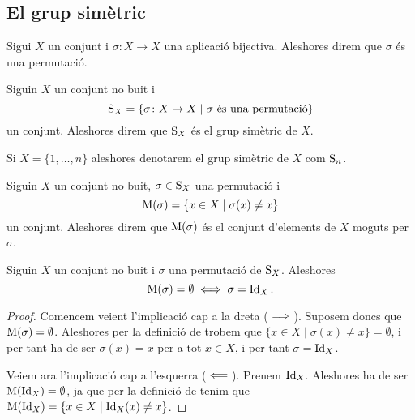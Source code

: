 \documentclass[../Apunts.tex]{subfiles}
\begin{document}
	\subsection{El grup simètric}
	\begin{definition}[Permutació]
		\label{def:permutació}
		Sigui \(X\) un conjunt i \(\sigma\colon X\rightarrow X\) una aplicació bijectiva. Aleshores direm que \(\sigma\) és una permutació.
	\end{definition}
	\begin{definition}
		\label{def:grup simètric}
		Siguin \(X\) un conjunt no buit i
		\[\operatorname{S}_{X}=\{\sigma\colon X\rightarrow X\mid\sigma\text{ és una permutació}\}\]
		un conjunt. Aleshores direm que \(\operatorname{S}_{X}\) és el grup simètric de \(X\).
		
		Si \(X=\{1,\dots,n\}\) aleshores denotarem el grup simètric de \(X\) com \(\operatorname{S}_{n}\).
	\end{definition}
	\begin{definition}
		\label{def:conjunt d'elements moguts per una permutació}
		Siguin \(X\) un conjunt no buit, \(\sigma\in\operatorname{S}_{X}\) una permutació i
		\[\operatorname{M}(\sigma)=\{x\in X\mid\sigma(x)\neq x\}\]
		un conjunt. Aleshores direm que \(\operatorname{M}(\sigma)\) és el conjunt d'elements de \(X\) moguts per \(\sigma\).
	\end{definition}
	\begin{proposition}
		\label{prop:permutació identitat si i només si no mou res}
		\label{prop:permutació no mou res si i només si és la identitat}
		Siguin \(X\) un conjunt no buit i \(\sigma\) una permutació de \(\operatorname{S}_{X}\). Aleshores
		\[\operatorname{M}(\sigma)=\emptyset\iff\sigma=\operatorname{Id}_{X}.\]
		\begin{proof}
			Comencem veient l'implicació cap a la dreta (\(\implies\)). Suposem doncs que \(\operatorname{M}(\sigma)=\emptyset\). Aleshores per la definició de  trobem que \(\{x\in X\mid\sigma(x)\neq x\}=\emptyset\), i per tant ha de ser \(\sigma(x)=x\) per a tot \(x\in X\), i per tant \(\sigma=\operatorname{Id}_{X}\).
			
			Veiem ara l'implicació cap a l'esquerra (\(\impliedby\)). Prenem \(\operatorname{Id}_{X}\). Aleshores ha de ser \(\operatorname{M}(\operatorname{Id}_{X})=\emptyset\), ja que per la definició de  tenim que \(\operatorname{M}(\operatorname{Id}_{X})=\{x\in X\mid\operatorname{Id}_{X}(x)\neq x\}\).
		\end{proof}
	\end{proposition}
\end{document}
